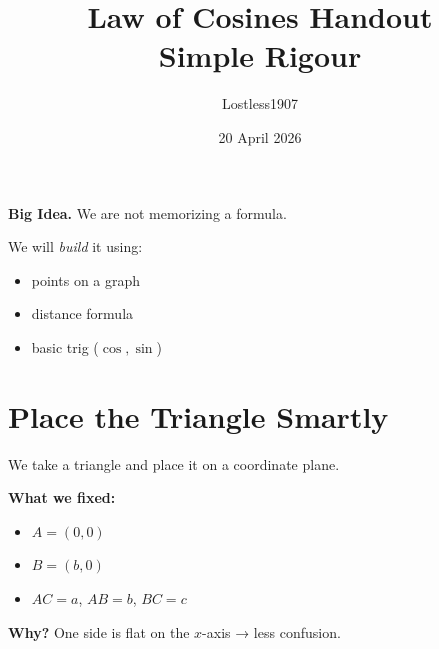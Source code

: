 \documentclass[11pt]{article}
\title{\textbf{\textcolor{main}{Law of Cosines Handout}}\\
\large \textcolor{accent}{Simple Rigour}}
\author{Lostless1907}
\date{20 April 2026}
\begin{document}
\maketitle
\vspace{-1em}

\begin{tcolorbox}[colback=soft, colframe=main]
\textbf{Big Idea.} We are not memorizing a formula.

We will \textit{build} it using:
\begin{itemize}
\item points on a graph
\item distance formula
\item basic trig ($\cos, \sin$)
\end{itemize}
\end{tcolorbox}

\section*{\textcolor{main}{Place the Triangle Smartly}}

We take a triangle and place it on a coordinate plane.

\begin{center}
\end{center}

\textbf{What we fixed:}
\begin{itemize}
\item $A = (0,0)$
\item $B = (b,0)$
\item $AC = a$, $AB = b$, $BC = c$
\end{itemize}

\textbf{Why?} One side is flat on the $x$-axis → less confusion.
\end{document}
